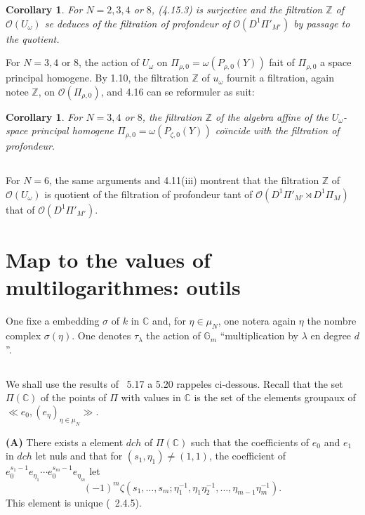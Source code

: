 \documentclass[11pt,a4paper]{article}
\theoremstyle{plain}
\newtheorem{corollary}[theorem]{Corollary}
\theoremstyle{definition}
\newcommand{\dch}{\mathit{dch}}
\newcommand{\Gm}{\mathbb{G}_m}
\newcommand{\Z}{\mathbb{Z}}
\newcommand{\C}{\mathbb{C}}
\begin{document}
\begin{corollary}\label{cor:4.16}
For $N=2,3,4$ or $8$, (4.15.3) is surjective and the filtration $\Z$ of $\mathcal{O}(U_\omega)$ se deduces of the filtration of profondeur of $\mathcal{O}(D^1\Pi'_{M'})$ by passage to the quotient.
\end{corollary}

For $N=3,4$ or $8$, the action of $U_\omega$ on $\Pi_{\rho,0} = \omega(P_{\rho,0}(Y))$ fait of $\Pi_{\rho,0}$ a space principal homogene. By 1.10, the filtration $\Z$ of $u_\omega$ fournit a filtration, again notee $\Z$, on $\mathcal{O}(\Pi_{\rho,0})$, and 4.16 can se reformuler as suit:

\begin{corollary}\label{cor:4.17}
For $N=3,4$ or $8$, the filtration $\Z$ of the algebra affine of the $U_\omega$-space principal homogene $\Pi_{\rho,0} = \omega(P_{\zeta,0}(Y))$ co\"{\i}ncide with the filtration of profondeur.
\end{corollary}

\subsection{}
For $N=6$, the same arguments and 4.11(iii) montrent that the filtration $\Z$ of $\mathcal{O}(U_\omega)$ is quotient of the filtration of profondeur tant of $\mathcal{O}(D^1\Pi'_{M'} \rtimes D^1\Pi_M)$ that of $\mathcal{O}(D^1\Pi'_{M'})$.

\section{Map to the values of multilogarithmes: outils}
\label{sec:5}

One fixe a embedding $\sigma$ of $k$ in $\C$ and, for $\eta \in \mu_N$, one notera again $\eta$ the nombre complex $\sigma(\eta)$. One denotes $\tau_\lambda$ the action of $\Gm$ ``multiplication by $\lambda$ en degree $d$''.

\subsection{}
We shall use the results of \cite{1}~5.17 a 5.20 rappeles ci-dessous. Recall that the set $\Pi(\C)$ of the points of $\Pi$ with values in $\C$ is the set of the elements groupaux of $\ll e_0, (e_\eta)_{\eta \in \mu_N} \gg$.

\textbf{(A)} There exists a element $\dch$ of $\Pi(\C)$ such that the coefficients of $e_0$ and $e_1$ in $\dch$ let nuls and that for $(s_1, \eta_1) \neq (1,1)$, the coefficient of $e_0^{s_1-1}e_{\eta_1} \cdots e_0^{s_m-1}e_{\eta_m}$ let
\[
(-1)^m \zeta(s_1,\ldots,s_m; \eta_1^{-1}, \eta_1\eta_2^{-1},\ldots, \eta_{m-1}\eta_m^{-1}).
\]
This element is unique (\cite{1}~2.4.5).
\end{document}
